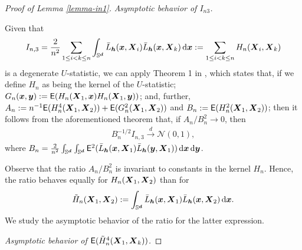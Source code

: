 \documentclass[oneside,11pt]{article}
\begin{document}
\begin{proof}[Proof of Lemma \ref{lemma-in1}]
\textit{Asymptotic behavior of $I_{n3}$.} 

Given that 
\begin{align*}
I_{n,3}=\frac{2}{n^2} \sum_{1 \le i<k \le n} \int_{\mathbb{S}^{\boldsymbol{d}}} \bar{L}_{{\boldsymbol{h}}} (\boldsymbol{x},\boldsymbol{X}_i) \bar{L}_{{\boldsymbol{h}}} (\boldsymbol{x},\boldsymbol{X}_k) \,\mathrm{d} \boldsymbol{x}:=\sum_{1 \le i<k \le n} H_n(\boldsymbol{X}_i,\boldsymbol{X}_k)
\end{align*}
is a degenerate $U$-statistic, we can apply Theorem 1 in \cite{hall1984central}, which states that, if we define $H_n$ as being the kernel of the $U$-statistic; $G_n(\boldsymbol{x},\boldsymbol{y}) := \mathsf{E} (H_n(\boldsymbol{X}_1,\boldsymbol{x})H_n(\boldsymbol{X}_1,\boldsymbol{y}))$; and, further, $A_n := n^{-1} \mathsf{E} (H_n^4(\boldsymbol{X}_1, \boldsymbol{X}_2)) + \mathsf{E} (G_n^2(\boldsymbol{X}_1,\boldsymbol{X}_2))$ and $B_n := \mathsf{E}(H_n^2(\boldsymbol{X}_1,\boldsymbol{X}_2))$; then it follows from the aforementioned theorem that, if $A_n / B_n^2 \to 0$, then
    \begin{align*}
        B_n^{-1/2} I_{n,3} \xrightarrow{d} \mathcal{N}(0, 1),
    \end{align*}
where $B_n = \frac{2}{n^2} \int_{\mathbb{S}^{\boldsymbol{d}}} \int_{\mathbb{S}^{\boldsymbol{d}}} \mathsf{E}^2 ( \bar{L}_{{\boldsymbol{h}}} (\boldsymbol{x},\boldsymbol{X}_1) \bar{L}_{{\boldsymbol{h}}} (\boldsymbol{y},\boldsymbol{X}_1) ) \,\mathrm{d} \boldsymbol{x} \,\mathrm{d} \boldsymbol{y}$.

Observe that the ratio $A_n/B_n^2$ is invariant to constants in the kernel $H_n$. Hence, the ratio behaves equally for $H_n(\boldsymbol{X}_1,\boldsymbol{X}_2)$ than for
\begin{align*}
    \tilde{H}_n(\boldsymbol{X}_1, \boldsymbol{X}_2) := \int_{\mathbb{S}^{\boldsymbol{d}}} \bar{L}_{{\boldsymbol{h}}} (\boldsymbol{x},\boldsymbol{X}_1) \bar{L}_{{\boldsymbol{h}}} (\boldsymbol{x},\boldsymbol{X}_2) \,\mathrm{d} \boldsymbol{x}.
\end{align*}
We study the asymptotic behavior of the ratio for the latter expression.

\textit{Asymptotic behavior of $\mathsf{E} (\tilde{H}_n^4(\boldsymbol{X}_1, \boldsymbol{X}_k))$.} 


\end{proof}
\end{document}
